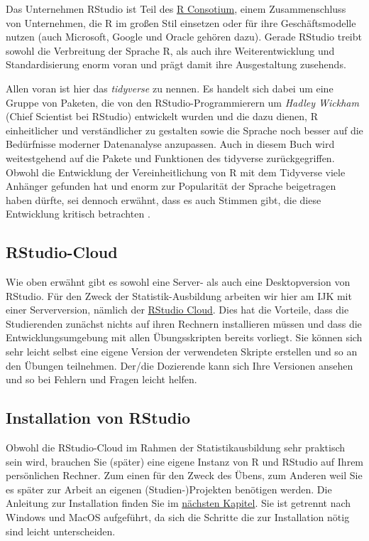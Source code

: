 \documentclass[
]{book}
\begin{document}
Das Unternehmen RStudio ist Teil des \href{https://www.r-consortium.org/}{R Consotium}, einem Zusammenschluss von Unternehmen, die R im großen Stil einsetzen oder für ihre Geschäftsmodelle nutzen (auch Microsoft, Google und Oracle gehören dazu).
Gerade RStudio treibt sowohl die Verbreitung der Sprache R, als auch ihre Weiterentwicklung und Standardisierung enorm voran und prägt damit ihre Ausgestaltung zusehends.

Allen voran ist hier das \emph{tidyverse} zu nennen. Es handelt sich dabei um eine Gruppe von Paketen, die von den RStudio-Programmierern um \emph{Hadley Wickham} (Chief Scientist bei RStudio) entwickelt wurden und die dazu dienen, R einheitlicher und verständlicher zu gestalten sowie die Sprache noch besser auf die Bedürfnisse moderner Datenanalyse anzupassen. Auch in diesem Buch wird weitestgehend auf die Pakete und Funktionen des tidyverse zurückgegriffen.
Obwohl die Entwicklung der Vereinheitlichung von R mit dem Tidyverse viele Anhänger gefunden hat und enorm zur Popularität der Sprache beigetragen haben dürfte, sei dennoch erwähnt, dass es auch Stimmen gibt, die diese Entwicklung kritisch betrachten \citep{Matloff_2019, McChesney_2020}.

\hypertarget{rstudio-cloud}{%
\subsection{RStudio-Cloud}\label{rstudio-cloud}}

Wie oben erwähnt gibt es sowohl eine Server- als auch eine Desktopversion von RStudio.
Für den Zweck der Statistik-Ausbildung arbeiten wir hier am IJK mit einer Serverversion, nämlich der \href{https://rstudio.cloud/}{RStudio Cloud}.
Dies hat die Vorteile, dass die Studierenden zunächst nichts auf ihren Rechnern installieren müssen und dass die Entwicklungsumgebung mit allen Übungsskripten bereits vorliegt.
Sie können sich sehr leicht selbst eine eigene Version der verwendeten Skripte erstellen und so an den Übungen teilnehmen.
Der/die Dozierende kann sich Ihre Versionen ansehen und so bei Fehlern und Fragen leicht helfen.

\hypertarget{installation-von-rstudio}{%
\subsection{Installation von RStudio}\label{installation-von-rstudio}}

Obwohl die RStudio-Cloud im Rahmen der Statistikausbildung sehr praktisch sein wird, brauchen Sie (später) eine eigene Instanz von R und RStudio auf Ihrem persönlichen Rechner. Zum einen für den Zweck des Übens, zum Anderen weil Sie es später zur Arbeit an eigenen (Studien-)Projekten benötigen werden.
Die Anleitung zur Installation finden Sie im \protect\hyperlink{intallation}{nächsten Kapitel}.
Sie ist getrennt nach Windows und MacOS aufgeführt, da sich die Schritte die zur Installation nötig sind leicht unterscheiden.
\end{document}
